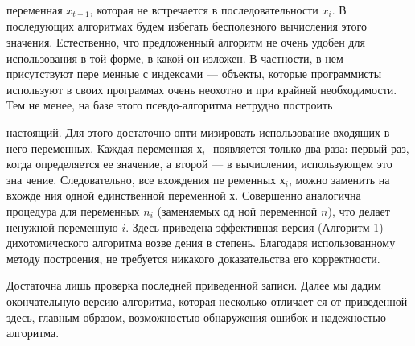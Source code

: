 \noindent переменная $x_{t+1}$, которая
не встречается в последовательности $x_{i}$. В последующих алгоритмах
будем избегать бесполезного вычисления этого значения. Естественно,
что предложенный алгоритм не очень удобен для использования в той
форме, в какой он изложен. В частности, в нем присутствуют пере­
менные с индексами — объекты, которые программисты используют в
своих программах очень неохотно и при крайней необходимости.
Тем не менее, на базе этого псевдо-алгоритма нетрудно построить

\noindent настоящий. Для этого достаточно опти­
мизировать использование входящих в
него переменных. Каждая переменная \textit{$х_{i}$}-
появляется только два раза: первый раз,
когда определяется ее значение, а второй
— в вычислении, использующем это зна­
чение. Следовательно, все вхождения пе­
ременных \textit{$х_{i}$}, можно заменить на вхожде­
ния одной единственной переменной \textit{$х$}.
Совершенно аналогична процедура для переменных \textit{$n_{i}$} (заменяемых од­
ной переменной \textit{$n$}), что делает ненужной переменную \textit{$i$}. Здесь приведена
эффективная версия (Алгоритм 1) дихотомического алгоритма возве­
дения в степень. Благодаря использованному методу построения, не
требуется никакого доказательства его корректности.

\parindent=1cm Достаточна лишь проверка последней приведенной записи. Далее мы
дадим окончательную версию алгоритма, которая несколько отличает­
ся от приведенной здесь, главным образом, возможностью обнаружения
ошибок и надежностью алгоритма.

